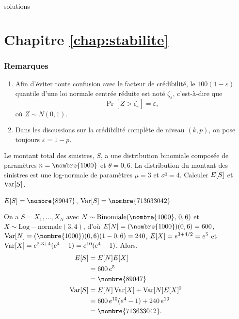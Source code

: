 \begin{Filesave}{solutions}
\section*{Chapitre \ref*{chap:stabilite}}

\subsubsection*{Remarques}
\begin{enumerate}
  \item Afin d'éviter toute confusion avec le facteur de crédibilité,
    le $100(1 - \varepsilon)${\ieme} quantile d'une loi normale
    centrée réduite est noté $\zeta_\varepsilon$, c'est-à-dire que
    \begin{displaymath}
      \Pr[Z > \zeta_\varepsilon] = \varepsilon,
    \end{displaymath}
    où $Z \sim N(0, 1)$.
  \item Dans les discussions sur la crédibilité complète de niveau
    $(k, p)$, on pose toujours $\varepsilon = 1 - p$.
  \end{enumerate}
\bigskip

\end{Filesave}

\begin{exercice}
  Le montant total des sinistres, $S$, a une distribution binomiale
  composée de paramètres $n = \nombre{1000}$ et $\theta = 0,6$. La
  distribution du montant des sinistres est une log-normale de
  paramètres $\mu = 3$ et $\sigma² = 4$. Calculer $E [ S ]$ et
  $\operatorname{Var} [ S ]$.
  \begin{rep}
    $\esp{S} = \nombre{89047}$, $\var{S} = \nombre{713633042}$
  \end{rep}
  \begin{sol}
    On a $S = X_1, \dots, X_N$ avec
    $N \sim \mathrm{Binomiale}(\nombre{1000},\, 0,6)$ et
    $X \sim \mathrm{Log-normale}(3, 4)$, d'où
    $\esp{N} = (\nombre{1000})(0,6) = 600$,
    $\var{N} = (\nombre{1000})(0,6)(1 - 0,6) = 240$,
    $E [ X ] = e^{3 + 4/2} = e^5$ et
    $\operatorname{Var} [ X ] = e^{2 \cdot 3 + 4}(e^4 - 1) = e^{10}(e^4 - 1)$.
    Alors,
    \begin{align*}
      \esp{S}
      &= \esp{N} \esp{X} \\
      &= 600\, e^5 \\
      &= \nombre{89047} \\
      \var{S}
      &= \esp{N} \var{X} + \var{N} \esp{X}^2 \\
      &= 600\, e^{10}(e^4 - 1) + 240\, e^{10} \\
      &= \nombre{713633042}.
    \end{align*}
  \end{sol}
\end{exercice}

